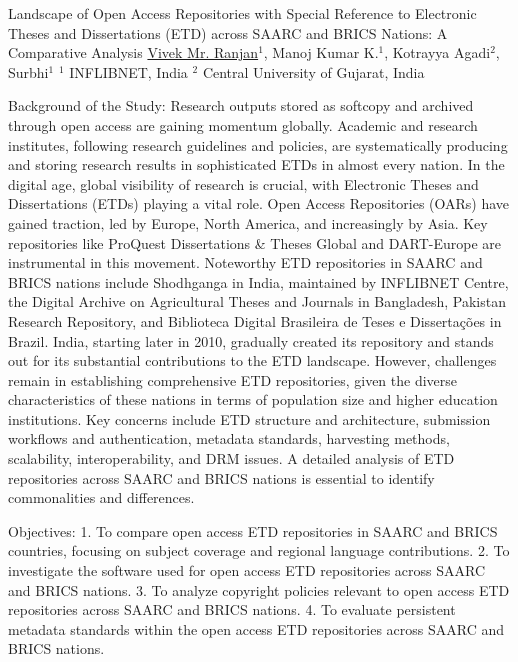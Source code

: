 \begin{abstract_online}{Landscape of Open Access Repositories with Special Reference to Electronic Theses and Dissertations (ETD) across SAARC and BRICS Nations: A Comparative Analysis}{%
    \underline{Vivek Mr. Ranjan}$^{1}$, Manoj Kumar K.$^{1}$, Kotrayya Agadi$^{2}$, Surbhi$^{1}$}{%
    }{%
    $^1$ INFLIBNET, India \newline{}%
    $^2$ Central University of Gujarat, India%
}

Background of the Study: Research outputs stored as softcopy and archived through open access are gaining momentum globally. Academic and research institutes, following research guidelines and policies, are systematically producing and storing research results in sophisticated ETDs in almost every nation. In the digital age, global visibility of research is crucial, with Electronic Theses and Dissertations (ETDs) playing a vital role. Open Access Repositories (OARs) have gained traction, led by Europe, North America, and increasingly by Asia. Key repositories like ProQuest Dissertations \& Theses Global and DART-Europe are instrumental in this movement. Noteworthy ETD repositories in SAARC and BRICS nations include Shodhganga in India, maintained by INFLIBNET Centre, the Digital Archive on Agricultural Theses and Journals in Bangladesh, Pakistan Research Repository, and Biblioteca Digital Brasileira de Teses e Dissertações in Brazil. India, starting later in 2010, gradually created its repository and stands out for its substantial contributions to the ETD landscape. However, challenges remain in establishing comprehensive ETD repositories, given the diverse characteristics of these nations in terms of population size and higher education institutions. Key concerns include ETD structure and architecture, submission workflows and authentication, metadata standards, harvesting methods, scalability, interoperability, and DRM issues. A detailed analysis of ETD repositories across SAARC and BRICS nations is essential to identify commonalities and differences.

Objectives:
1. To compare open access ETD repositories in SAARC and BRICS countries, focusing on subject coverage and regional language contributions.
2. To investigate the software used for open access ETD repositories across SAARC and BRICS nations.
3. To analyze copyright policies relevant to open access ETD repositories across SAARC and BRICS nations.
4. To evaluate persistent metadata standards within the open access ETD repositories across SAARC and BRICS nations.


\end{abstract_online}
